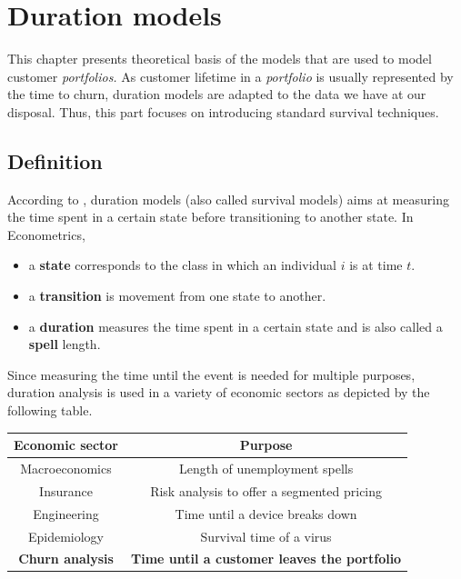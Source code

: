 \documentclass[
]{book}
\providecommand{\tightlist}{%
  \setlength{\itemsep}{0pt}\setlength{\parskip}{0pt}}
\begin{document}
\hypertarget{duration}{%
\chapter{Duration models}\label{duration}}

This chapter presents theoretical basis of the models that are used to model customer \emph{portfolios.} As customer lifetime in a \emph{portfolio} is usually represented by the time to churn, duration models are adapted to the data we have at our disposal. Thus, this part focuses on introducing standard survival techniques.

\hypertarget{definition}{%
\section{Definition}\label{definition}}

According to \citet{CAMERON_TRIVEDI}, duration models (also called survival models) aims at measuring the time spent in a certain state before transitioning to another state. In Econometrics,

\begin{itemize}
\tightlist
\item
  a \textbf{state} corresponds to the class in which an individual \(i\) is at time \(t\).
\item
  a \textbf{transition} is movement from one state to another.
\item
  a \textbf{duration} measures the time spent in a certain state and is also called a \textbf{spell} length.
\end{itemize}

Since measuring the time until the event is needed for multiple purposes, duration analysis is used in a variety of economic sectors as depicted by the following table.

\begin{longtable}[]{@{}cc@{}}
\toprule
Economic sector & Purpose \\
\midrule
\endhead
Macroeconomics & Length of unemployment spells \\
Insurance & Risk analysis to offer a segmented pricing \\
Engineering & Time until a device breaks down \\
Epidemiology & Survival time of a virus \\
\textbf{Churn analysis} & \textbf{Time until a customer leaves the portfolio} \\
\bottomrule
\end{longtable}
\end{document}
